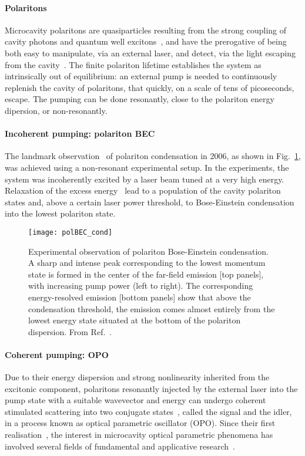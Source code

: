\paragraph{Polaritons}
Microcavity polaritons are quasiparticles resulting from the strong
coupling of cavity photons and quantum well excitons~\cite{bastard,
  deveaud2003electron}, and have the prerogative of being both easy to
manipulate, via an external laser, and detect, via the light escaping
from the cavity~\cite{9780199228942}. The finite polariton lifetime
establishes the system as intrinsically out of equilibrium: an
external pump is needed to continuously replenish the cavity of
polaritons, that quickly, on a scale of tens of picoseconds,
escape. The pumping can be done resonantly, close to the polariton
energy dipersion, or non-resonantly.

\paragraph{Incoherent pumping: polariton BEC}
The landmark observation~\cite{Kasprzak_2006} of polariton
condensation in 2006, as shown in Fig.~\ref{fig:polBEC}, was achieved
using a non-resonant experimental setup. In the experiments, the
system was incoherently excited by a laser beam tuned at a very high
energy. Relaxation of the excess energy~\cite{RevModPhys.82.1489,
  Keeling_2007} lead to a population of the cavity polariton states
and, above a certain laser power threshold, to Bose-Einstein
condensation into the lowest polariton state.
%
\begin{figure}[tb]\centering
  \texttt{[image: polBEC\_cond]}
  \caption{
    Experimental observation of polariton Bose-Einstein
    condensation. A sharp and intense peak corresponding to the lowest
    momentum state is formed in the center of the far-field emission [top
    panels], with increasing pump power (left to right). The
    corresponding energy-resolved emission [bottom panels] show that
    above the condensation threshold, the emission comes almost entirely
    from the lowest energy state situated at the bottom of the polariton
    dispersion. From Ref.~\cite{Kasprzak_2006}.
  }\label{fig:polBEC}
\end{figure}
%

\paragraph{Coherent pumping: OPO}
Due to their energy dispersion and strong nonlinearity inherited from
the excitonic component, polaritons resonantly injected by the
external laser into the pump state with a suitable wavevector and
energy can undergo coherent stimulated scattering into two conjugate
states~\cite{Ciuti_2000,Ciuti_2001,Ciuti_2003}, called the signal and
the idler, in a process known as optical parametric oscillator
(OPO). Since their first realisation~\cite{Stevenson_2000,
  Savvidis_2000, Savvidis_2000_b, Baumberg_2000, Saba_2001}, the
interest in microcavity optical parametric phenomena has involved
several fields of fundamental and applicative
research~\cite{Edamatsu_2004, Savasta_2005, Lanco_2006, Abbarchi_2011,
  Ardizzone_2012, Xie_2012, Lecomte_2013}. 

